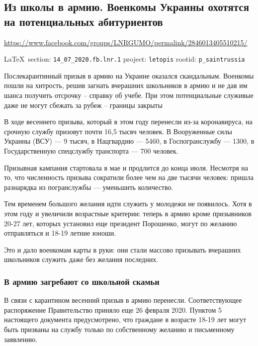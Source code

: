  
 
  
  
\subsection{Из школы в армию. Военкомы Украины охотятся на потенциальных абитуриентов }
\url{https://www.facebook.com/groups/LNRGUMO/permalink/2846013405510215/}

\vspace{0.5cm}
 {\ifDEBUG\small\LaTeX~section: \verb|14_07_2020.fb.lnr.1| project: \verb|letopis| rootid: \verb|p_saintrussia| \fi}
\vspace{0.5cm}
  
  
Послекарантинный призыв в армию на Украине оказался скандальным. Военкомы пошли
на хитрость, решив загнать вчерашних школьников в армию и не дав им шанса
получить отсрочку – справку об учебе. При этом потенциальные служивые даже не
могут сбежать за рубеж – границы закрыты 

В ходе весеннего призыва, который в этом году перенесли из-за коронавируса, на
срочную службу призовут почти 16,5 тысяч человек. В Вооруженные силы Украины
(ВСУ) — 9 тысяч, в Нацгвардию — 5460, в Госпогранслужбу — 1300, в
Государственную спецслужбу транспорта — 700 человек. 

Призывная кампания стартовала в мае и продлится до конца июля. Несмотря на то,
что численность призыва сократили более чем на две тысячи человек: пришла
разнарядка из погранслужбы — уменьшить количество. 

Тем временем большого желания идти служить у молодежи не появилось. Хотя в этом
году и увеличили возрастные критерии: теперь в армию кроме призывников 20-27
лет, которых установил еще президент Порошенко, могут по желанию отправляться и
18-19 летние юноши. 

Это и дало военкомам карты в руки: они стали массово призывать вчерашних
школьников служить даже без желания последних. 

\subsubsection{В армию загребают со школьной скамьи }

В связи с карантином весенний призыв в армию перенесли. Соответствующее
распоряжение Правительство приняло еще 26 февраля 2020. Пунктом 5 настоящего
документа предусмотрено, что граждане в возрасте 18-19 лет могут быть призваны
на службу только по собственному желанию и письменному заявлению. 

